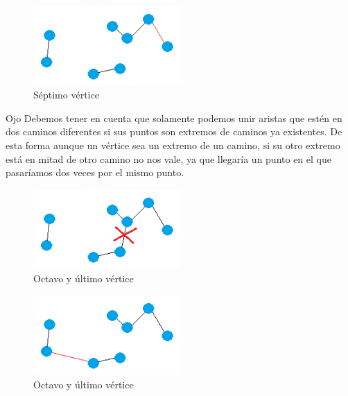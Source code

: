 \begin{frame}
	\begin{exampleblock}{ }
	\begin{figure}[htbH] 
		\centering
		\includegraphics[width=0.5\textwidth]{./Imagenes/arista6.png}
		\caption{Séptimo vértice} 
	\end{figure}
	\end{exampleblock}
\end{frame}

\begin{frame}
	\begin{alertblock}{Ojo} 
	Debemos tener en cuenta que solamente podemos unir aristas que estén en dos caminos 
	diferentes si sus puntos son extremos de caminos ya existentes. De esta forma aunque 
	un vértice sea un extremo de un camino, si su otro extremo está en mitad de otro 
	camino no nos vale, ya que llegaría un punto en el que pasaríamos dos veces por el 
	mismo punto.
	\end{alertblock}
\end{frame}

\begin{frame}
	\begin{exampleblock}{ }
	\begin{figure}[htbH] 
		\centering
		\includegraphics[width=0.5\textwidth]{./Imagenes/arista6fail.png}
		\caption{Octavo y último vértice} 
	\end{figure}
	\end{exampleblock}
\end{frame}		
	

\begin{frame}
	\begin{exampleblock}{ } 
	\begin{figure}[htbH] 
		\centering
		\includegraphics[width=0.5\textwidth]{./Imagenes/arista7.png}
		\caption{Octavo y último vértice} 
	\end{figure}
	\end{exampleblock}
\end{frame}


